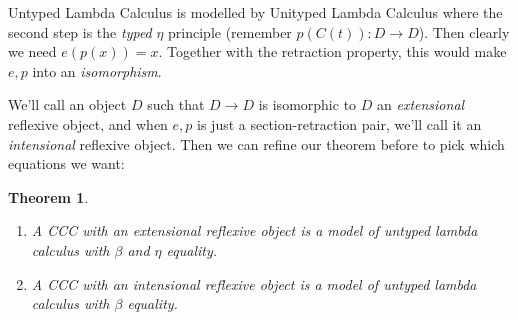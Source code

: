 \documentclass{article}
\newcommand{\reflcompile}[1]{C(#1)}
\newtheorem{theorem}{Theorem}
\begin{document}
\begin{section}{Untyped Lambda Calculus is modelled by Unityped Lambda Calculus}
  where the second step is the \emph{typed} $\eta$ principle (remember
  $p(\reflcompile{t}) : D \to D$). Then clearly we need $e(p(x)) =
  x$. Together with the retraction property, this would make $e,p$
  into an \emph{isomorphism}.

  We'll call an object $D$ such that $D \to D$ is isomorphic to $D$ an
  \emph{extensional} reflexive object, and when $e,p$ is just a
  section-retraction pair, we'll call it an \emph{intensional}
  reflexive object.
  Then we can refine our theorem before to pick which equations we
  want:

  \begin{theorem}
    \begin{enumerate}
    \item A CCC with an \emph{extensional} reflexive object is a model
      of untyped lambda calculus with $\beta$ and $\eta$ equality.
    \item A CCC with an \emph{intensional} reflexive object is a model
      of untyped lambda calculus with $\beta$ equality.
    \end{enumerate}
  \end{theorem}
\end{section}
\end{document}
